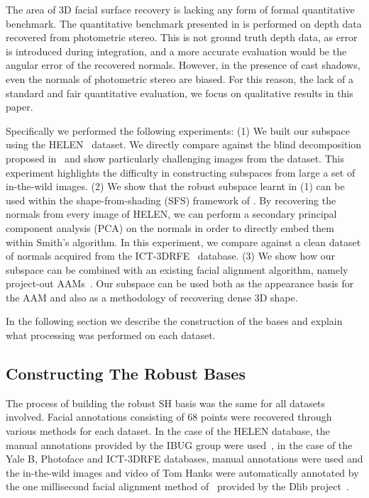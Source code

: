 The area of 3D facial surface recovery is lacking any form of formal
quantitative benchmark. The quantitative benchmark presented in
\cite{RefWorks:311} is performed on depth data recovered from photometric
stereo. This is not ground truth depth data, as error is introduced during
integration, and a more accurate evaluation would be the angular error of the
recovered normals. However, in the presence of cast shadows, even the normals of
photometric stereo are biased. For this reason, the lack of a standard and fair
quantitative evaluation, we focus on qualitative results in this paper.

Specifically we performed the following experiments: (1) We built our subspace
using the HELEN~\cite{RefWorks:318} dataset. We directly compare against the
blind decomposition proposed in~\cite{RefWorks:311} and show particularly
challenging images from the dataset. This experiment highlights the difficulty
in constructing subspaces from large a set of in-the-wild images. (2) We show
that the robust subspace learnt in (1) can be used within the shape-from-shading
(SFS) framework of \citet{RefWorks:90}. By recovering the normals
from every image of HELEN, we can perform a secondary principal component
analysis (PCA) on the normals in order to directly embed them within Smith's
algorithm. In this experiment, we compare against a clean dataset of normals
acquired from the ICT-3DRFE~\cite{Stratou:2012jh} database. (3) We show how our
subspace can be combined with an existing facial alignment algorithm, namely
project-out AAMs~\cite{RefWorks:227}. Our subspace can be used both as the
appearance basis for the AAM and also as a methodology of recovering dense 3D
shape.

In the following section we describe the construction of the bases and explain
what processing was performed on each dataset.
\subsection{Constructing The Robust Bases}\label{subsec:construction}
The process of building the robust SH basis was the same for all datasets
involved. Facial annotations consisting of 68 points were recovered through
various methods for each dataset. In the case of the HELEN database, the manual
annotations provided by the IBUG group were used~\cite{Sagonas:et,Sagonas:fn},
in the case of the Yale B, Photoface and ICT-3DRFE databases, manual annotations
were used and the in-the-wild images and video of Tom Hanks were automatically
annotated by the one millisecond facial alignment method of~\cite{Kazemi:he}
provided by the Dlib project~\cite{dlib09}.

